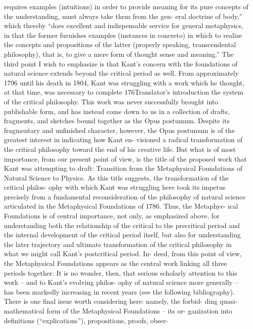 requires examples (intuitions) in order to provide meaning for its pure
concepts of the understanding, must always take them from the gen-
eral doctrine of body,” which thereby “does excellent and indispensable
service for general metaphysics, in that the former furnishes examples
(instances in concreto) in which to realize the concepts and propositions
of the latter (properly speaking, transcendental philosophy), that is, to
give a mere form of thought sense and meaning.”
The third point I wish to emphasize is that Kant’s concern with the
foundations of natural science extends beyond the critical period as well.
From approximately 1796 until his death in 1804, Kant was struggling
with a work which he thought, at that time, was necessary to complete
176Translator’s introduction
the system of the critical philosophy. This work was never successfully
brought into publishable form, and has instead come down to us in a
collection of drafts, fragments, and sketches bound together as the Opus
postumum. Despite its fragmentary and unﬁnished character, however,
the Opus postumum is of the greatest interest in indicating how Kant en-
visioned a radical transformation of the critical philosophy toward the
end of his creative life. But what is of most importance, from our present
point of view, is the title of the proposed work that Kant was attempting
to draft: Transition from the Metaphysical Foundations of Natural Science to
Physics. As this title suggests, the transformation of the critical philos-
ophy with which Kant was struggling here took its impetus precisely
from a fundamental reconsideration of the philosophy of natural science
articulated in the Metaphysical Foundations of 1786. Thus, the Metaphys-
ical Foundations is of central importance, not only, as emphasized above,
for understanding both the relationship of the critical to the precritical
period and the internal development of the critical period itself, but also
for understanding the later trajectory and ultimate transformation of the
critical philosophy in what we might call Kant’s postcritical period. In-
deed, from this point of view, the Metaphysical Foundations appears as the
central work linking all three periods together. It is no wonder, then, that
serious scholarly attention to this work – and to Kant’s evolving philos-
ophy of natural science more generally – has been markedly increasing
in recent years (see the following bibliography).
There is one ﬁnal issue worth considering here: namely, the forbid-
ding quasi-mathematical form of the Metaphysical Foundations – its or-
ganization into deﬁnitions (“explications”), propositions, proofs, obser-
